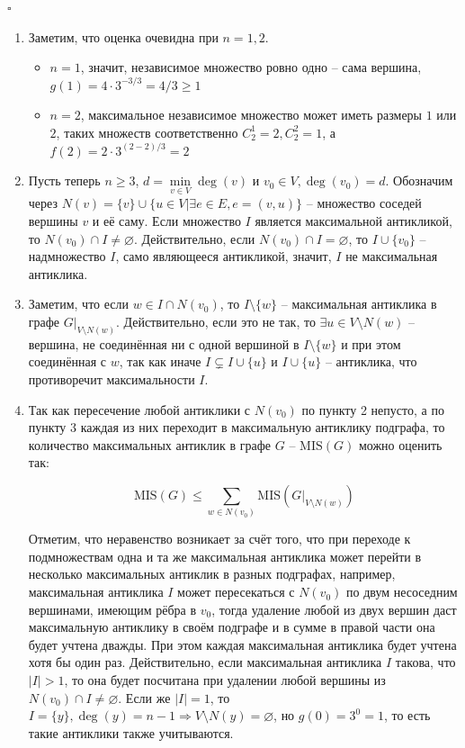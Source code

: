 \documentclass{article}
\begin{document}
\noindent $\square$
\begin{enumerate}
\item Заметим, что оценка очевидна при $n=1,2$.
\begin{itemize}
    \item $n=1$, значит, независимое множество ровно одно -- сама вершина, $g(1) = 4\cdot 3^{-3/3} = 4/3\geq 1$
    \item $n=2$, максимальное независимое множество может иметь размеры $1$ или $2$,
    таких множеств соответственно $C_2^1 = 2, C_2^2=1$, а $f(2)=2\cdot3^{(2-2)/3}=2$
\end{itemize}

\item Пусть теперь $n\geq 3$, $d = \min\limits_{v\in V}\deg(v)$ и $v_0\in V, \deg(v_0)=d$.
Обозначим через $N(v) = \{v\}\cup\{u\in V|\exists e\in E, e=(v, u)\}$ -- множество соседей вершины $v$ и её саму. Если множество
$I$ является максимальной антикликой, то $N(v_0)\cap I\not=\varnothing$. Действительно, если
$N(v_0)\cap I=\varnothing$, то $I\cup\{v_0\}$ -- надмножество $I$, само являющееся антикликой, значит,
$I$ не максимальная антиклика.

\item Заметим, что если $w\in I\cap N(v_0)$, то $I\setminus\{w\}$ -- максимальная антиклика в графе $G|_{V\setminus N(w)}$. Действительно,
если это не так, то $\exists u\in V\setminus N(w)$ -- вершина, не соединённая ни с одной вершиной в $I\setminus\{w\}$ и при этом соединённая с $w$,
так как иначе $I\subsetneq I\cup\{u\}$ и $I\cup\{u\}$ -- антиклика, что противоречит максимальности $I$.

\item Так как пересечение любой антиклики с $N(v_0)$ по пункту 2 непусто, а по пункту 3 каждая из них переходит в максимальную антиклику подграфа, то
количество максимальных антиклик в графе $G$ -- $\text{MIS}(G)$ можно оценить так:

$$\text{MIS}(G) \leq \sum\limits_{w\in N(v_0)} \text{MIS}(G|_{V\setminus N(w)})$$

Отметим, что неравенство возникает за счёт того, что при переходе к подмножествам одна и та же максимальная антиклика может перейти в несколько максимальных антиклик
в разных подграфах, например, максимальная антиклика $I$ может пересекаться с $N(v_0)$ по двум несоседним вершинами, имеющим рёбра в $v_0$, тогда удаление
любой из двух вершин даст максимальную антиклику в своём подграфе и в сумме в правой части она будет учтена дважды. При этом каждая максимальная антиклика
будет учтена хотя бы один раз. Действительно, если максимальная антиклика $I$ такова, что $|I|>1$, то она будет посчитана при удалении любой вершины из
$N(v_0) \cap I\not=\varnothing$. Если же $|I|=1$, то $I=\{y\}, \deg(y) = n-1 \Rightarrow V\setminus N(y)=\varnothing$, но $g(0) = 3^0 = 1$, то есть такие антиклики
также учитываются.


\end{enumerate}
\end{document}
